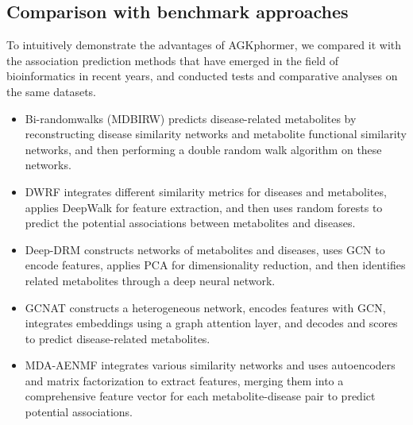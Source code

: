 \documentclass[lettersize,journal]{IEEEtran}
\begin{document}
\subsection{\textbf{Comparison with benchmark approaches}}
To intuitively demonstrate the advantages of AGKphormer, we compared it with the association prediction methods that have emerged in the field of bioinformatics in recent years, and conducted tests and comparative analyses on the same datasets.
\begin{itemize}
	\item Bi-randomwalks (MDBIRW)\cite{lei2019prediction} predicts disease-related metabolites by reconstructing disease similarity networks and metabolite functional similarity networks, and then performing a double random walk algorithm on these networks.
	
	\item DWRF\cite{tie2021metabolite} integrates different similarity metrics for diseases and metabolites, applies DeepWalk for feature extraction, and then uses random forests to predict the potential associations between metabolites and diseases.
	
	\item Deep-DRM\cite{zhao2021deep} constructs networks of metabolites and diseases, uses GCN to encode features, applies PCA for dimensionality reduction, and then identifies related metabolites through a deep neural network.
	
	\item GCNAT\cite{sun2022deep} constructs a heterogeneous network, encodes features with GCN, integrates embeddings using a graph attention layer, and decodes and scores to predict disease-related metabolites.
	
	\item MDA-AENMF\cite{gao2023predicting} integrates various similarity networks and uses autoencoders and matrix factorization to extract features, merging them into a comprehensive feature vector for each metabolite-disease pair to predict potential associations. 
	
\end{itemize}
\end{document}
